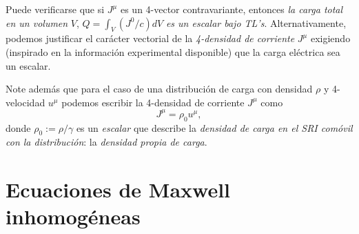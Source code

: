 Puede verificarse que si $J^\mu$ es un 4-vector
contravariante, entonces \textit{la carga total en un volumen} $V$, $Q=\int_V (J^0/c)dV$ \textit{es un escalar bajo TL's}. Alternativamente, podemos justificar el carácter
vectorial de la \textit{4-densidad de corriente} $J^\mu$ exigiendo (inspirado en la información experimental disponible) que la carga eléctrica sea un escalar.

Note además que para el caso de una distribución de carga con densidad $\rho$ y 4-velocidad $u^\mu$ podemos escribir la 4-densidad de corriente $J^\mu$ como
\begin{equation}
\boxed{J^\mu=\rho_0 u^\mu,}
\end{equation}
donde $\rho_0:={\rho}/{\gamma}$ es un \textit{escalar} que describe la \textit{densidad de carga en el SRI comóvil con la distribución}: la \textit{densidad propia de carga}.


\section{Ecuaciones de Maxwell inhomogéneas}

